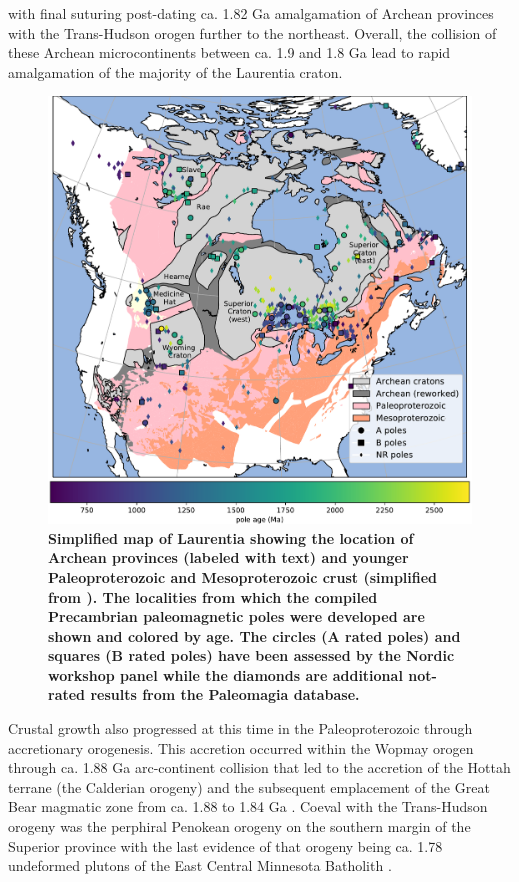 \documentclass[11pt,letterpaper]{article}
\begin{document}
with final suturing post-dating ca. 1.82 Ga amalgamation of Archean provinces with the Trans-Hudson orogen further to the northeast. Overall, the collision of these Archean microcontinents between ca. 1.9 and 1.8 Ga lead to rapid amalgamation of the majority of the Laurentia craton.

\begin{figure}
\centering
\includegraphics[width=\textwidth]{Figures/Fig1_map.pdf}
\caption{\small{\textbf{Simplified map of Laurentia showing the location of Archean provinces (labeled with text) and younger Paleoproterozoic and Mesoproterozoic crust (simplified from \citealp{Whitmeyer2007a}). The localities from which the compiled Precambrian paleomagnetic poles were developed are shown and colored by age. The circles (A rated poles) and squares (B rated poles) have been assessed by the Nordic workshop panel while the diamonds are additional not-rated results from the Paleomagia database.}}}
\label{fig:Laurentia_map}
\end{figure} 

Crustal growth also progressed at this time in the Paleoproterozoic through accretionary orogenesis. This accretion occurred within the Wopmay orogen through ca. 1.88 Ga arc-continent collision that led to the accretion of the Hottah terrane (the Calderian orogeny) and the subsequent emplacement of the Great Bear magmatic zone from ca. 1.88 to 1.84 Ga \citep{Hildebrand2009a}. Coeval with the Trans-Hudson orogeny was the perphiral Penokean orogeny on the southern margin of the Superior province with the last evidence of that orogeny being ca. 1.78 undeformed plutons of the East Central Minnesota Batholith \citep{Holm2005a}. 
\end{document}
